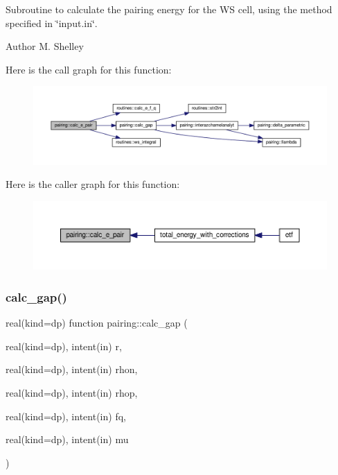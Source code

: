 Subroutine to calculate the pairing energy for the WS cell, using the method specified in \char`\"{}input.\+in\char`\"{}. 

\begin{DoxyAuthor}{Author}
M. Shelley 
\end{DoxyAuthor}
Here is the call graph for this function\+:
\nopagebreak
\begin{figure}[H]
\begin{center}
\leavevmode
\includegraphics[width=350pt]{namespacepairing_ac34989a934af1e6a63131c619426c5aa_cgraph}
\end{center}
\end{figure}
Here is the caller graph for this function\+:
\nopagebreak
\begin{figure}[H]
\begin{center}
\leavevmode
\includegraphics[width=350pt]{namespacepairing_ac34989a934af1e6a63131c619426c5aa_icgraph}
\end{center}
\end{figure}
\mbox{\label{namespacepairing_abad69eb8cb33077add1b9da84bff7c55}} 
\subsubsection{\texorpdfstring{calc\+\_\+gap()}{calc\_gap()}}
{\footnotesize\ttfamily real(kind=dp) function pairing\+::calc\+\_\+gap (\begin{DoxyParamCaption}\item[{real(kind=dp), intent(in)}]{r,  }\item[{real(kind=dp), intent(in)}]{rhon,  }\item[{real(kind=dp), intent(in)}]{rhop,  }\item[{real(kind=dp), intent(in)}]{fq,  }\item[{real(kind=dp), intent(in)}]{mu }\end{DoxyParamCaption})}



